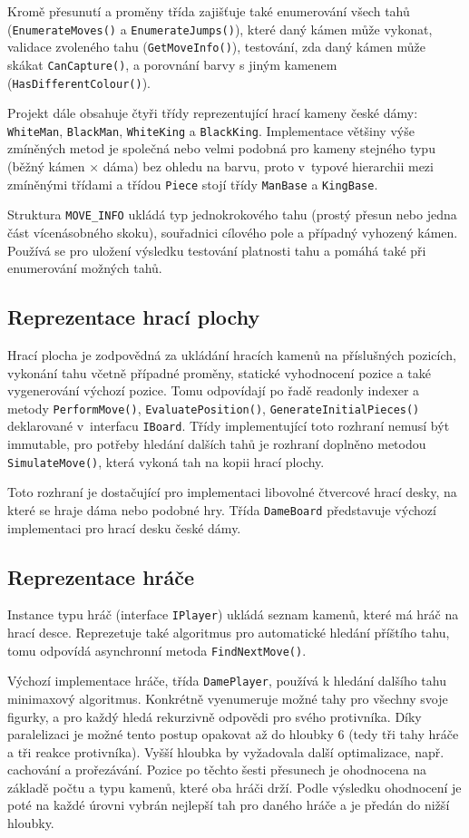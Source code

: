 \documentclass[a4paper,12pt]{article}
\renewcommand{\tt}[1]{\texttt{#1}}
\begin{document}
	Kromě přesunutí a proměny třída zajišťuje také enumerování všech tahů (\tt{EnumerateMoves()} a \tt{EnumerateJumps()}), které daný kámen může vykonat, validace zvoleného tahu (\tt{GetMoveInfo()}), testování, zda daný kámen může skákat \tt{CanCapture()}, a porovnání barvy s jiným kamenem (\tt{HasDifferent\-Colour()}).
	
	Projekt dále obsahuje čtyři třídy reprezentující hrací kameny české dámy: \tt{WhiteMan}, \tt{BlackMan}, \tt{WhiteKing} a \tt{BlackKing}. Implementace většiny výše zmíněných metod je společná nebo velmi podobná pro kameny stejného typu (běžný kámen × dáma) bez ohledu na barvu, proto v~typové hierarchii mezi zmíněnými třídami a třídou \tt{Piece} stojí třídy \tt{ManBase} a \tt{KingBase}.
	
	Struktura \tt{MOVE\_INFO} ukládá typ jednokrokového tahu (prostý přesun nebo jedna část vícenásobného skoku), souřadnici cílového pole a případný vyhozený kámen. Používá se pro uložení výsledku testování platnosti tahu a pomáhá také při enumerování možných tahů.
	
	\subsection{Reprezentace hrací plochy}
	Hrací plocha je zodpovědná za ukládání hracích kamenů na příslušných pozicích, vykonání tahu včetně případné proměny, statické vyhodnocení pozice a také vygenerování výchozí pozice. Tomu odpovídají po řadě readonly indexer a metody \tt{PerformMove()}, \tt{EvaluatePosition()}, \tt{GenerateInitial\-Pieces()} deklarované v~interfacu \tt{IBoard}.
	Třídy implementující toto rozhraní nemusí být immutable, pro potřeby hledání dalších tahů je rozhraní doplněno metodou \tt{SimulateMove()}, která vykoná tah na kopii hrací plochy.
	
	Toto rozhraní je dostačující pro implementaci libovolné čtvercové hrací desky, na které se hraje dáma nebo podobné hry. Třída \tt{DameBoard} před\-sta\-vu\-je výchozí implementaci pro hrací desku české dámy.
	
	\subsection{Reprezentace hráče}
	Instance typu hráč (interface \tt{IPlayer}) ukládá seznam kamenů, které má hráč na hrací desce. Reprezetuje také algoritmus pro automatické hledání příštího tahu, tomu odpovídá asynchronní metoda \tt{FindNextMove()}.
	
	Výchozí implementace hráče, třída \tt{DamePlayer}, používá k hledání dalšího tahu minimaxový algoritmus. Konkrétně vyenumeruje možné tahy pro všech\-ny svoje figurky, a pro každý hledá rekurzivně odpovědi pro svého protivníka. Díky paralelizaci je možné tento postup opakovat až do hloubky 6 (tedy tři tahy hráče a tři reakce protivníka). Vyšší hloubka by vyžadovala další optimalizace, např. cachování a prořezávání. Pozice po těchto šesti přesunech je ohodnocena na základě počtu a typu kamenů, které oba hráči drží. Podle výsledku ohodnocení je poté na každé úrovni vybrán nejlepší tah pro daného hráče a je předán do nižší hloubky.
	
\end{document}
